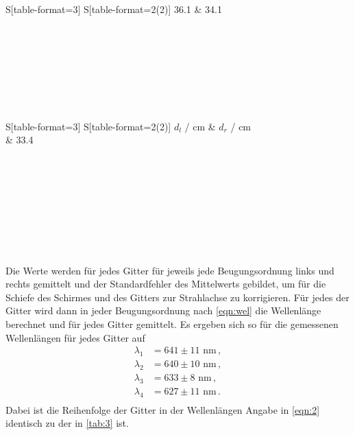 \begin{table}[H]
\begin{tabular}{S[table-format=3] S[table-format=2(2)]}
    36.1 & 34.1 \\
    \\
    \\
    \\
    \\
    \\
    \\
    \\
    \bottomrule
  \end{tabular}
  \begin{tabular}{S[table-format=3] S[table-format=2(2)]}
    \toprule
    {$d_l$ / $\mathrm{cm}$} & {$d_r$ / $\mathrm{cm}$} \\
     & 33.4 \\
    \\
    \\
    \\
    \\
    \\
    \\
    \\
    \\
    \bottomrule
  \end{tabular}
  \label{tab:3}
\end{table}
\noindent
Die Werte werden für jedes Gitter für jeweils jede Beugungsordnung links und rechts gemittelt und der Standardfehler des Mittelwerts gebildet, um für die Schiefe des Schirmes und des Gitters zur Strahlachse zu korrigieren.
Für jedes der Gitter wird dann in jeder Beugungsordnung nach \autoref{eqn:wel} die Wellenlänge berechnet und für jedes Gitter gemittelt. Es ergeben sich so für die gemessenen Wellenlängen für jedes Gitter auf
\begin{align}
  \label{eqn:2}
  \lambda_1 &= 641 \pm 11 \, \, \mathrm{nm} \, ,  \\
  \lambda_2 &= 640 \pm 10 \, \, \mathrm{nm} \, ,\\
  \lambda_3 &= 633 \pm 8 \, \, \mathrm{nm}  \, , \\
  \lambda_4 &= 627 \pm 11 \, \, \mathrm{nm} \, . \\
\end{align} 
Dabei ist die Reihenfolge der Gitter in der Wellenlängen Angabe in \autoref{eqn:2} identisch zu der in \autoref{tab:3} ist.
\newpage
